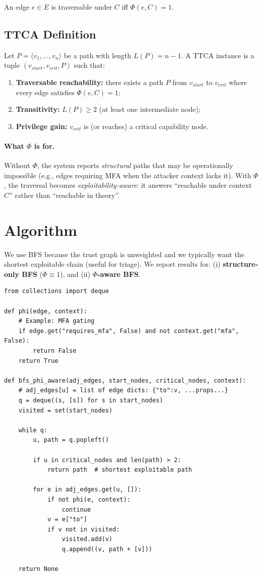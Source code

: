 \documentclass[a4paper,11pt]{article}
\begin{document}
An edge \(e\in E\) is traversable under \(C\) iff \(\Phi(e,C)=1\).

\subsection{TTCA Definition}
Let \(P=\langle v_1,\dots,v_n\rangle\) be a path with length \(L(P)=n-1\).
A TTCA instance is a tuple \((v_{start}, v_{crit}, P)\) such that:
\begin{enumerate}
  \item \textbf{Traversable reachability:} there exists a path \(P\) from \(v_{start}\) to \(v_{crit}\) where every edge satisfies \(\Phi(e,C)=1\);
  \item \textbf{Transitivity:} \(L(P)\ge 2\) (at least one intermediate node);
  \item \textbf{Privilege gain:} \(v_{crit}\) is (or reaches) a critical capability node.
\end{enumerate}

\paragraph{What $\Phi$ is for.}
Without \(\Phi\), the system reports \textit{structural} paths that may be operationally impossible (e.g., edges requiring MFA when the attacker context lacks it). With \(\Phi\), the traversal becomes \textit{exploitability-aware}: it answers “reachable under context \(C\)” rather than “reachable in theory”.

\section{Algorithm}
We use BFS because the trust graph is unweighted and we typically want the shortest exploitable chain (useful for triage). We report results for:
(i) \textbf{structure-only BFS} (\(\Phi \equiv 1\)), and
(ii) \textbf{\(\Phi\)-aware BFS}.

\begin{lstlisting}[style=code]
from collections import deque

def phi(edge, context):
    # Example: MFA gating
    if edge.get("requires_mfa", False) and not context.get("mfa", False):
        return False
    return True

def bfs_phi_aware(adj_edges, start_nodes, critical_nodes, context):
    # adj_edges[u] = list of edge dicts: {"to":v, ...props...}
    q = deque((s, [s]) for s in start_nodes)
    visited = set(start_nodes)

    while q:
        u, path = q.popleft()

        if u in critical_nodes and len(path) > 2:
            return path  # shortest exploitable path

        for e in adj_edges.get(u, []):
            if not phi(e, context):
                continue
            v = e["to"]
            if v not in visited:
                visited.add(v)
                q.append((v, path + [v]))

    return None
\end{lstlisting}
\end{document}
